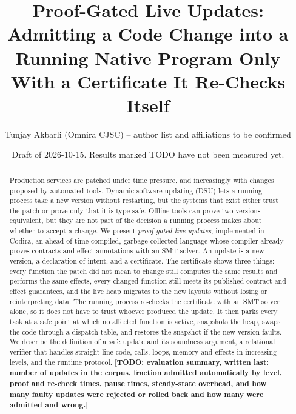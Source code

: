 \documentclass[10pt,twocolumn]{article}
\title{Proof-Gated Live Updates: Admitting a Code Change into a Running Native Program Only With a Certificate It Re-Checks Itself}
\author{Tunjay Akbarli (Omnira CJSC) -- author list and affiliations to be confirmed}
\date{Draft of 2026-10-15. Results marked TODO have not been measured yet.}
\newcommand{\todo}[1]{{\color{red}\textbf{[TODO: #1]}}}
\begin{document}
\maketitle
\begin{abstract}
Production services are patched under time pressure, and increasingly with changes proposed by automated tools. Dynamic software updating (DSU) lets a running process take a new version without restarting, but the systems that exist either trust the patch or prove only that it is type safe. Offline tools can prove two versions equivalent, but they are not part of the decision a running process makes about whether to accept a change. We present \emph{proof-gated live updates}, implemented in Codira, an ahead-of-time compiled, garbage-collected language whose compiler already proves contracts and effect annotations with an SMT solver. An update is a new version, a declaration of intent, and a certificate. The certificate shows three things: every function the patch did not mean to change still computes the same results and performs the same effects, every changed function still meets its published contract and effect guarantees, and the live heap migrates to the new layouts without losing or reinterpreting data. The running process re-checks the certificate with an SMT solver alone, so it does not have to trust whoever produced the update. It then parks every task at a safe point at which no affected function is active, snapshots the heap, swaps the code through a dispatch table, and restores the snapshot if the new version faults. We describe the definition of a safe update and its soundness argument, a relational verifier that handles straight-line code, calls, loops, memory and effects in increasing levels, and the runtime protocol. \todo{evaluation summary, written last: number of updates in the corpus, fraction admitted automatically by level, proof and re-check times, pause times, steady-state overhead, and how many faulty updates were rejected or rolled back and how many were admitted and wrong.}

\end{abstract}
\end{document}
